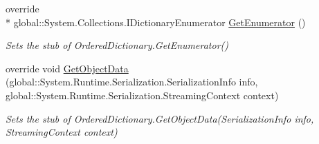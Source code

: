 \begin{DoxyCompactItemize}
override \\*
global\-::\-System.\-Collections.\-I\-Dictionary\-Enumerator \hyperlink{class_system_1_1_collections_1_1_specialized_1_1_fakes_1_1_stub_ordered_dictionary_a2be2df95b619248ac8ccf486b31f3587}{Get\-Enumerator} ()
\begin{DoxyCompactList}\small\item\em Sets the stub of Ordered\-Dictionary.\-Get\-Enumerator()\end{DoxyCompactList}\item 
override void \hyperlink{class_system_1_1_collections_1_1_specialized_1_1_fakes_1_1_stub_ordered_dictionary_aa5ff8ba6aa2f567eec419b59dae14ead}{Get\-Object\-Data} (global\-::\-System.\-Runtime.\-Serialization.\-Serialization\-Info info, global\-::\-System.\-Runtime.\-Serialization.\-Streaming\-Context context)
\begin{DoxyCompactList}\small\item\em Sets the stub of Ordered\-Dictionary.\-Get\-Object\-Data(\-Serialization\-Info info, Streaming\-Context context)\end{DoxyCompactList}\end{DoxyCompactItemize}
